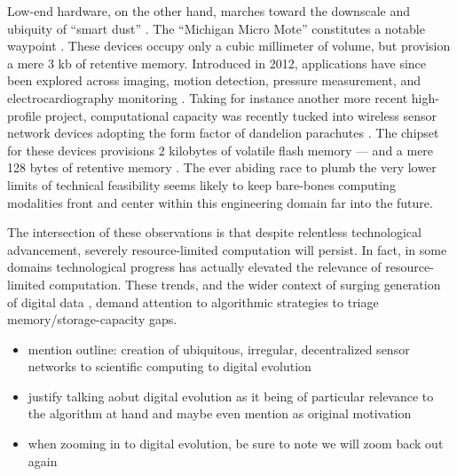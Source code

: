 Low-end hardware, on the other hand, marches toward the downscale and ubiquity of ``smart dust'' \citep{warneke2001smart}.
The ``Michigan Micro Mote'' constitutes a notable waypoint \citep{lee2012modular}.
These devices occupy only a cubic millimeter of volume, but provision a mere 3 kb of retentive memory.
Introduced in 2012, applications have since been explored across imaging, motion detection, pressure measurement, and electrocardiography monitoring \citep{lee2015review}.
Taking for instance another more recent high-profile project, computational capacity was recently tucked into wireless sensor network devices adopting the form factor of dandelion parachutes \citep{iyer2022wind}.
The chipset for these devices provisions 2 kilobytes of volatile flash memory --- and a mere 128 bytes of retentive memory \citep{microchip2014atiny20}.
The ever abiding race to plumb the very lower limits of technical feasibility seems likely to keep bare-bones computing modalities front and center within this engineering domain far into the future.

The intersection of these observations is that despite relentless technological advancement, severely resource-limited computation will persist.
In fact, in some domains technological progress has actually elevated the relevance of resource-limited computation.
These trends, and the wider context of surging generation of digital data \citep{bhat2018data}, demand attention to algorithmic strategies to triage memory/storage-capacity gaps.


\begin{itemize}
  \item mention outline: creation of ubiquitous, irregular, decentralized sensor networks to scientific computing to digital evolution
  \item justify talking aobut digital evolution as it being of particular relevance to the algorithm at hand and maybe even mention as original motivation
  \item when zooming in to digital evolution, be sure to note we will zoom back out again
\end{itemize}

